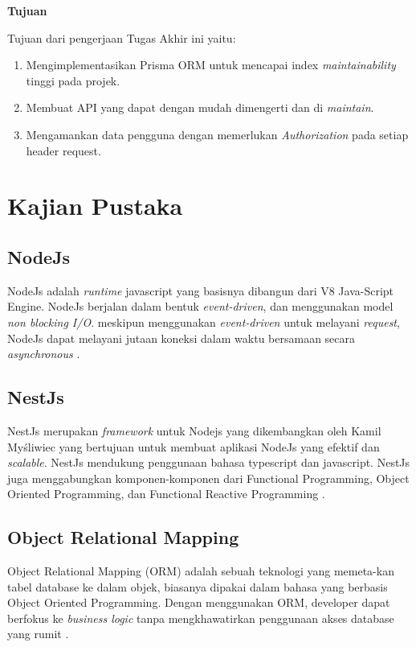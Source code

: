\noindent\textbf{Tujuan}

Tujuan dari pengerjaan Tugas Akhir ini yaitu:
\begin{enumerate}
  \item Mengimplementasikan Prisma ORM untuk mencapai index \textit{maintainability} tinggi pada projek.
  \item Membuat API yang dapat dengan mudah dimengerti dan di \textit{maintain}.
  \item Mengamankan data pengguna dengan memerlukan \textit{Authorization} pada setiap header request.
  
\end{enumerate}



\section{Kajian Pustaka}
\subsection{NodeJs}
NodeJs adalah \textit{runtime} javascript yang basisnya dibangun dari V8 Java-Script Engine. NodeJs berjalan dalam bentuk \textit{event-driven}, dan menggunakan model \textit{non blocking I/O}. meskipun menggunakan \textit{event-driven} untuk melayani \textit{request}, NodeJs dapat melayani jutaan koneksi dalam waktu bersamaan secara \textit{asynchronous} \cite{shah2017node}.

\subsection{NestJs}
NestJs merupakan \textit{framework} untuk Nodejs yang dikembangkan oleh Kamil Myśliwiec yang bertujuan untuk membuat aplikasi NodeJs yang efektif dan \textit{scalable}. NestJs mendukung penggunaan bahasa typescript dan javascript. NestJs juga menggabungkan komponen-komponen dari Functional Programming, Object Oriented Programming, dan Functional Reactive Programming \cite{pham2020developing} \cite{NestJS}.

\subsection{Object Relational Mapping}
Object Relational Mapping (ORM) adalah sebuah teknologi yang memeta-kan tabel database ke dalam objek, biasanya dipakai dalam bahasa yang berbasis Object Oriented Programming. Dengan menggunakan ORM, developer dapat berfokus ke \textit{business logic} tanpa mengkhawatirkan penggunaan akses database yang rumit \cite{lorenz2017object}. 

